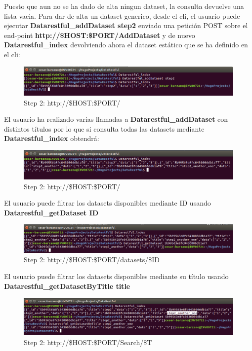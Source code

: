\documentclass[a4paper,11pt]{book}
\begin{document}
Puesto que aun no se ha dado de alta ningun dataset, la consulta devuelve una lista vacia. Para dar de alta un dataset generico, desde el cli, el usuario puede ejecutar \textbf{Datarestful\_addDataset step2} enviado una petición POST sobre el end-point \textbf{http://\$HOST:\$PORT/AddDataset} y de nuevo \textbf{Datarestful\_index} devolviendo ahora el dataset estático que se ha definido en el cli: 

\begin{figure}[H]  
\centering 
\includegraphics[scale=0.35]{imagenes/add_dataset.png}
\caption{ Step 2: http://\$HOST:\$PORT/   }  
\end{figure} 

El usuario ha realizado varias llamadas a \textbf{Datarestful\_addDataset } con distintos títulos por lo que si consulta todas las datasets mediante \textbf{Datarestful\_index} obtendrá:

\begin{figure}[H]  
\centering 
\includegraphics[scale=0.35]{imagenes/many.png}
\caption{ Step 2: http://\$HOST:\$PORT/   }  
\end{figure} 

El usuario puede filtrar los datasets disponibles mediante ID usando \textbf{Datarestful\_getDataset ID}

\begin{figure}[H]  
\centering 
\includegraphics[scale=0.35]{imagenes/id.png}
\caption{ Step 2: http://\$HOST:\$PORT/datasets/\$ID   }  
\end{figure} 

El usuario puede filtrar los datasets disponibles mediante su título usando \textbf{Datarestful\_getDatasetByTitle title}

\begin{figure}[H]  
\centering 
\includegraphics[scale=0.35]{imagenes/string.png}
\caption{ Step 2: http://\$HOST:\$PORT/Search/\$T   }  
\end{figure}
\end{document}
